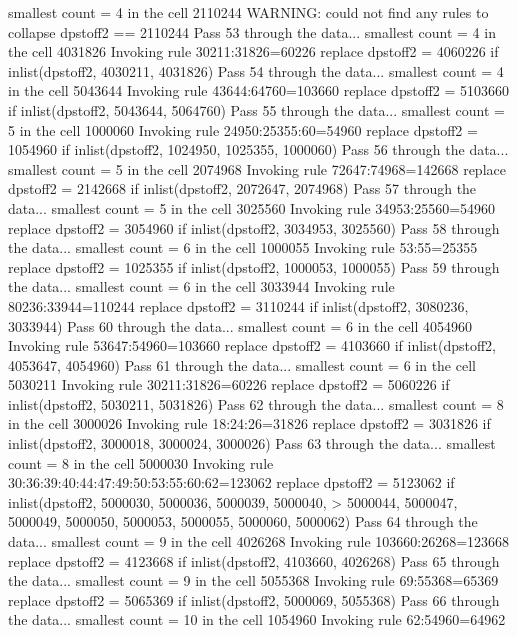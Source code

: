   smallest count = 4 in the cell      2110244
  WARNING: could not find any rules to collapse dpstoff2 == 2110244
Pass 53 through the data...
  smallest count = 4 in the cell      4031826
  Invoking rule 30211:31826=60226
  replace dpstoff2 = 4060226 if inlist(dpstoff2, 4030211, 4031826)
Pass 54 through the data...
  smallest count = 4 in the cell      5043644
  Invoking rule 43644:64760=103660
  replace dpstoff2 = 5103660 if inlist(dpstoff2, 5043644, 5064760)
Pass 55 through the data...
  smallest count = 5 in the cell      1000060
  Invoking rule 24950:25355:60=54960
  replace dpstoff2 = 1054960 if inlist(dpstoff2, 1024950, 1025355, 1000060)
Pass 56 through the data...
  smallest count = 5 in the cell      2074968
  Invoking rule 72647:74968=142668
  replace dpstoff2 = 2142668 if inlist(dpstoff2, 2072647, 2074968)
Pass 57 through the data...
  smallest count = 5 in the cell      3025560
  Invoking rule 34953:25560=54960
  replace dpstoff2 = 3054960 if inlist(dpstoff2, 3034953, 3025560)
Pass 58 through the data...
  smallest count = 6 in the cell      1000055
  Invoking rule 53:55=25355
  replace dpstoff2 = 1025355 if inlist(dpstoff2, 1000053, 1000055)
Pass 59 through the data...
  smallest count = 6 in the cell      3033944
  Invoking rule 80236:33944=110244
  replace dpstoff2 = 3110244 if inlist(dpstoff2, 3080236, 3033944)
Pass 60 through the data...
  smallest count = 6 in the cell      4054960
  Invoking rule 53647:54960=103660
  replace dpstoff2 = 4103660 if inlist(dpstoff2, 4053647, 4054960)
Pass 61 through the data...
  smallest count = 6 in the cell      5030211
  Invoking rule 30211:31826=60226
  replace dpstoff2 = 5060226 if inlist(dpstoff2, 5030211, 5031826)
Pass 62 through the data...
  smallest count = 8 in the cell      3000026
  Invoking rule 18:24:26=31826
  replace dpstoff2 = 3031826 if inlist(dpstoff2, 3000018, 3000024, 3000026)
Pass 63 through the data...
  smallest count = 8 in the cell      5000030
  Invoking rule 30:36:39:40:44:47:49:50:53:55:60:62=123062
  replace dpstoff2 = 5123062 if inlist(dpstoff2, 5000030, 5000036, 5000039, 5000040,
>  5000044, 5000047, 5000049, 5000050, 5000053, 5000055, 5000060, 5000062)
Pass 64 through the data...
  smallest count = 9 in the cell      4026268
  Invoking rule 103660:26268=123668
  replace dpstoff2 = 4123668 if inlist(dpstoff2, 4103660, 4026268)
Pass 65 through the data...
  smallest count = 9 in the cell      5055368
  Invoking rule 69:55368=65369
  replace dpstoff2 = 5065369 if inlist(dpstoff2, 5000069, 5055368)
Pass 66 through the data...
  smallest count = 10 in the cell      1054960
  Invoking rule 62:54960=64962
